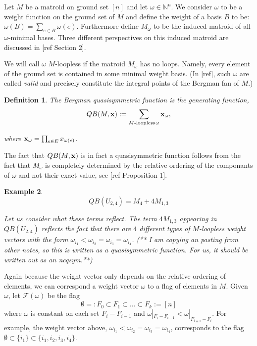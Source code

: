 \documentclass[12pt]{amsart}
\newtheorem{definition}{Definition}
\newtheorem{example}[definition]{Example}
\newcommand{\om}{\omega}
\begin{document}
Let $M$ be a matroid on ground set $[n]$ and let $\omega \in \mathbb{N}^n$.
We consider $\omega$ to be a weight function on the ground set of $M$ and define the weight of a basis $B$ to be: $\omega(B) = \sum_{e\in B} \omega(e)$. 
Furthermore define $M_{\omega}$ to be the induced matroid of all
$\omega$-minimal bases.  Three different perspectives on this induced
matroid are discussed in [ref Section 2].

  We will call $\omega$
$M$-loopless if the matroid $M_{\omega}$ has no loops.  Namely, every
element of the ground set is contained in some minimal weight basis.
(In [ref], such $\omega$ are called {\em valid} and precisely
constitute the integral points of the Bergman fan of $M$.)

\begin{definition}
The Bergman quasisymmetric function is the generating function,
$$QB(M,{\bf x}) := \sum_{M\textrm{-loopless} \, \omega} {\bf x}_{\omega},$$

where ${\bf x}_{\omega} = \prod_{e \in E} x_{\omega(e)}$.
\end{definition}

The fact that $QB(M,{\bf x})$ is in fact a quasisymmetric function follows
from the fact that $M_{\omega}$ is completely determined by the
relative ordering of the componants of $\omega$ and not their exact
value, see [ref Proposition 1].

\begin{example}
$$QB(U_{2,4})  = M_4 + 4M_{1,3}$$

Let us consider what these terms reflect.  The term $4M_{1,3}$
appearing in $QB(U_{2,4})$ reflects the fact that there are $4$
different types of $M$-loopless weight vectors with the form
$\omega_{i_1} < \omega_{i_2} = \omega_{i_3} = \omega_{i_4}$.
(** I am copying an pasting from other notes, so this is written as a quasisymmetric function.  For us, it should be written out as an ncqsym.**)
\end{example}


Again because the weight vector only depends on the relative ordering
of elements, we can correspond a weight vector $\om$ to a flag of
elements in $M$.  Given $\om$, let $\mathcal{F}(\om)$ be the flag 
$$\emptyset =: F_0 \subset F_1 \subset \ldots \subset F_k := [n]$$
where $\om$ is constant on each set $F_i - F_{i-1}$ and $\om|_{F_i - F_{i-1}} < \om|_{F_{i+1} - F_{i}} $.  For example, the weight vector above,  $\om_{i_1} < \om_{i_2} = \om_{i_3} = \om_{i_4}$, corresponds to the flag ${\emptyset \subset \{i_1\} \subset \{i_1,i_2,i_3,i_4\}}$.
\end{document}
